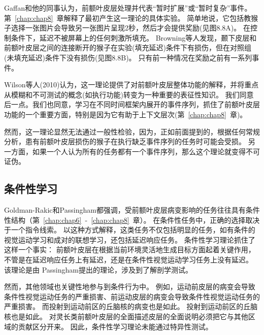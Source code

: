 Gaffan和他的同事认为，前额叶皮层处理并代表“暂时扩展”或“暂时复杂”事件\cite{browning2008prefrontal}。
第~\ref{chap:chap8}~章解释了最初产生这一理论的具体实验。
简单地说，它包括教猴子选择一张图片会导致另一张图片呈现2秒，然后才会提供奖励(见图8.8A)。
在控制条件下，延迟不被屏幕上的任何刺激所填充。
Browning等人发现，颞下皮层和前额叶皮层之间的连接断开的猴子在实验(填充延迟)条件下有损伤，但在对照组(未填充延迟)条件下没有损伤(见图8.8B)。
只有前一种情况在奖励之前有一系列事件。
\par


Wilson等人(2010)认为，这一理论提供了对前额叶皮层整体功能的解释，并将重点从模糊和不可测试的概念(如执行功能)转变为一种重要的表征性知识。
我们同意后一点。我们也同意，学习在不同时间框架内展开的事件序列，抓住了前额叶皮层功能的一个重要方面，特别是因为它有助于上下文层次(第~\ref{chap:chap8}~章)。
\par


然而，这一理论显然无法通过一般性检验，因为，正如前面提到的，根据任何常规分析，患有前额叶皮层损伤的猴子在执行缺乏事件序列的任务时可能会受损。
另一方面，如果一个人认为所有的任务都有一个事件序列，那么这个理论就变得不可证伪。



\subsection{条件性学习}

Goldman-Rakic\cite{goldman2011circuitry}和Passingham\cite{passingham1995frontal}都强调，受前额叶皮层病变影响的任务往往具有条件性结构（第~\ref{chap:chap6}~-~\ref{chap:chap8}~章）。
在条件性任务中，正确的选择取决于一个指令线索。
以这种方式解释，这类任务不仅包括明显的任务，如有条件的视觉运动学习和成对的联想学习，还包括延迟响应任务。
条件性学习理论抓住了这样一个事实：
前额叶皮层在根据当前环境灵活地生成目标方面起着关键作用，不管是在延迟响应任务上有延迟，还是在条件性视觉运动学习任务上没有延迟。
该理论是由 Passingham\cite{passingham1995frontal}提出的理论，涉及到了解剖学测试。
\par


然而，其他领域也关键性地参与到条件行为中。
例如，运动前皮层的病变会导致条件性视觉运动任务的严重损害、前运动皮层的病变会导致条件性视觉运动任务的严重损害\cite{halsband1985premotor,petrides2019conditional}。
而投射到运动前区的丘脑核的病变也是如此。
投射到运动前区的丘脑核也是如此\cite{canavan1989motor}。
对灵长类前额叶皮层的全面描述皮层的全面说明必须把它与其他区域的贡献区分开来。
因此，条件性学习理论未能通过特异性测试。
\par


